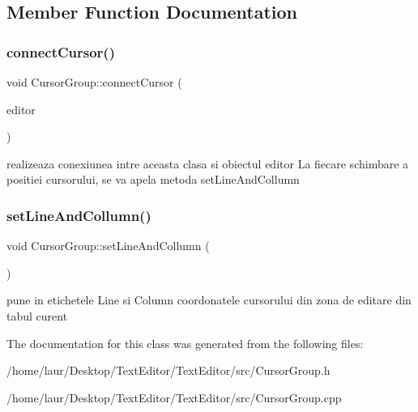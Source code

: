 \subsection{Member Function Documentation}
\mbox{\label{class_cursor_group_a443ff52a9e41c5b3c5cf15e0087db1d6}} 
\subsubsection{\texorpdfstring{connect\+Cursor()}{connectCursor()}}
{\footnotesize\ttfamily void Cursor\+Group\+::connect\+Cursor (\begin{DoxyParamCaption}\item[{Q\+Plain\+Text\+Edit $\ast$}]{editor }\end{DoxyParamCaption})}

realizeaza conexiunea intre aceasta clasa si obiectul editor La fiecare schimbare a positiei cursorului, se va apela metoda set\+Line\+And\+Collumn \mbox{\label{class_cursor_group_af216081a863ff279d67227c355f112e1}} 
\subsubsection{\texorpdfstring{set\+Line\+And\+Collumn()}{setLineAndCollumn()}}
{\footnotesize\ttfamily void Cursor\+Group\+::set\+Line\+And\+Collumn (\begin{DoxyParamCaption}{ }\end{DoxyParamCaption})}

pune in etichetele Line si Column coordonatele cursorului din zona de editare din tabul curent 

The documentation for this class was generated from the following files\+:\begin{DoxyCompactItemize}
\item 
/home/laur/\+Desktop/\+Text\+Editor/\+Text\+Editor/src/Cursor\+Group.\+h\item 
/home/laur/\+Desktop/\+Text\+Editor/\+Text\+Editor/src/Cursor\+Group.\+cpp\end{DoxyCompactItemize}
